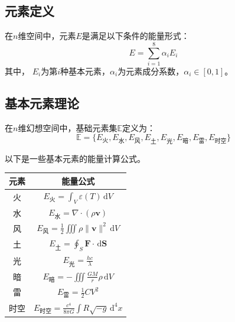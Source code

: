 \documentclass[lang=cn,newtx,10pt,scheme=chinese]{elegantbook}
\newcommand{\md}{\mathrm{d}}
\begin{document}
\subsection{元素定义}
\begin{definition}[元素]
    在$n$维空间中，元素$E$是满足以下条件的能量形式：
    \[
        E  = \sum_{i=1}^8 \alpha_i E_i
    \]
    其中，
    \(E_i\)为第$i$种基本元素，$\alpha_i$为元素成分系数，$\alpha_i \in [0,1]$。
\end{definition}

\subsection{基本元素理论}
\begin{definition}[元素本源]
    在$n$维幻想空间中，基础元素集$\mathbb{E}$定义为：
    \[
        \mathbb{E} = \{ E_{\text{火}}, E_{\text{水}}, E_{\text{风}}, E_{\text{土}}, E_{\text{光}}, E_{\text{暗}}, E_{\text{雷}}, E_{\text{时空}} \}
    \]
\end{definition}

以下是一些基本元素的能量计算公式。
\begin{table}[h]
    \centering
    \begin{tabular}{|c|c|}
        \hline
        \textbf{元素} & \textbf{能量公式}                                                           \\ \hline
        火           & $\displaystyle E_{\text{火}}=\int_V \varepsilon(T)\,\md V$               \\
        水           & $\displaystyle E_{\text{水}}=\nabla \cdot (\rho \bm{v})$                 \\
        风           & $\displaystyle E_{\text{风}}=\frac{1}{2}\iiint \rho \|\bm{v}\|^2\,\md V$ \\
        土           & $\displaystyle E_{\text{土}}=\oint_S \bm{F}\cdot\,\md \bm{S}$            \\
        光           & $\displaystyle E_{\text{光}}=\frac{hc}{\lambda}$                         \\
        暗           & $\displaystyle E_{\text{暗}}=-\iiint \frac{GM}{r} \rho\,\md V$           \\
        雷           & $\displaystyle E_{\text{雷}}=\frac{1}{2}CV^2$                            \\
        时空          & $\displaystyle E_{\text{时空}}=\frac{c^4}{8\pi G}\int R\sqrt{-g}\,\md^4x$ \\ \hline
    \end{tabular}
\end{table}
\end{document}
